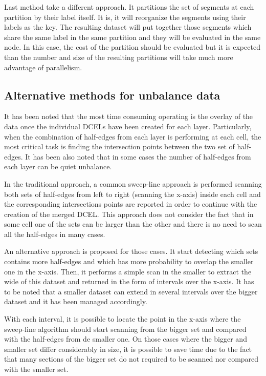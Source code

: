 Last method take a different approach.  It partitions the set of segments at each partition by their label itself.  It is, it will reorganize the segments using their labels as the key.  The resulting dataset will put together those segments which share the same label in the same partition and they will be evaluated in the same node.  In this case, the cost of the partition should be evaluated but it is expected than the number and size of the resulting partitions will take much more advantage of parallelism.

\subsection{Alternative methods for unbalance data}\label{sec:unbalance}
It has been noted that the most time consuming operating is the overlay of the data once the individual DCELs have been created for each layer.  Particularly, when the combination of half-edges from each layer is performing at each cell, the most critical task is finding the intersection points between the two set of half-edges. It has been also noted that in some cases the number of half-edges from each layer can be quiet unbalance.

In the traditional approach, a common sweep-line approach is performed scanning both sets of half-edges from left to right (scanning the x-axis) inside each cell and the corresponding intersections points are reported in order to continue with the creation of the merged DCEL. This approach does not consider the fact that in some cell one of the sets can be larger than the other and there is no need to scan all the half-edges in many cases.

An alternative approach is proposed for those cases.  It start detecting which sets contains more half-edges and which has more probability to overlap the smaller one in the x-axis. Then, it performs a simple scan in the smaller to extract the wide of this dataset and returned in the form of intervals over the x-axis.  It has to be noted that a smaller dataset can extend in several intervals over the bigger dataset and it has been managed accordingly.  

With each interval, it is possible to locate the point in the x-axis where the sweep-line algorithm should start scanning from the bigger set and compared with the half-edges from de smaller one. On those cases where the bigger and smaller set differ considerably in size, it is possible to save time due to the fact that many sections of the bigger set do not required to be scanned nor compared with the smaller set.